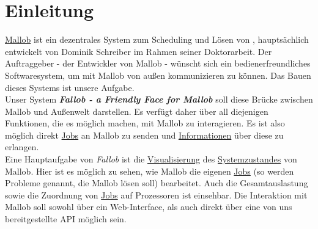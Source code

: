 \section{Einleitung}



\href{https://github.com/domschrei/mallob}{Mallob} ist ein dezentrales System zum Scheduling und Lösen von , hauptsächlich entwickelt von Dominik Schreiber im Rahmen seiner Doktorarbeit. Der Auftraggeber - der Entwickler von Mallob - wünscht sich ein bedienerfreundliches Softwaresystem, um mit Mallob von außen kommunizieren zu können. Das Bauen dieses Systems ist unsere Aufgabe.\\
Unser System \textbf{\textit{Fallob - a Friendly Face for Mallob}} soll diese Brücke zwischen Mallob und Außenwelt darstellen.
Es verfügt daher über all diejenigen Funktionen, die es möglich machen, mit Mallob zu interagieren. Es ist also möglich direkt \hyperref[B:Jobs]{Jobs} an Mallob zu senden und \hyperref[B:Job-Informationen]{Informationen} über diese zu erlangen.\\
Eine Hauptaufgabe von \textit{Fallob} ist die \hyperref[pages:visualization]{Visualisierung} des \hyperref[B:Systemzustand]{Systemzustandes} von Mallob. Hier ist es möglich zu sehen, wie Mallob die eigenen \hyperref[B:Jobs]{Jobs} (so werden Probleme genannt, die Mallob lösen soll) bearbeitet. Auch die Gesamtauslastung sowie die Zuordnung von \hyperref[B:Jobs]{Jobs} auf Prozessoren ist einsehbar. 
Die Interaktion mit Mallob soll sowohl über ein \gls{Web-Interface}, als auch direkt über eine von uns bereitgestellte \gls{API} möglich sein. %




